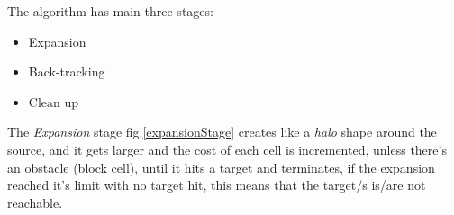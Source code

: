     The algorithm has main three stages:
    \begin{itemize}
        \item Expansion
        \item Back-tracking
        \item Clean up
    \end{itemize}

    The \textit{Expansion} stage fig.\ref{expansionStage} creates like a \textit{halo} shape around the source,
    and it gets larger and the cost of each cell is incremented,
    unless there's an obstacle (block cell),
    until it hits a target and terminates,
    if the expansion reached it's limit with no target hit, this means that the target/s is/are not
    reachable.

    \begin{figure}[htb]
        \label{fig:expansionStage}
        \centering


\end{figure}

